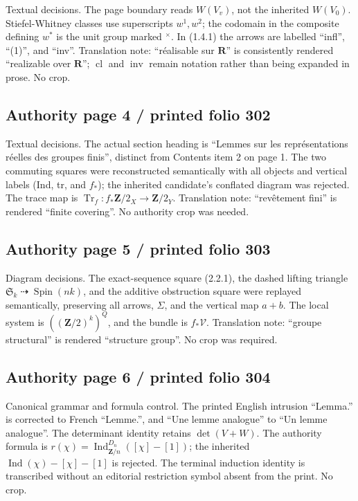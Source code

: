 \documentclass[10pt]{article}
\providecommand{\dashrightarrow}{\mathrel{⇢}}
\begin{document}
Textual decisions. The page boundary reads \(W(V_v)\), not the inherited \(W(V_0)\). Stiefel-Whitney classes use superscripts \(w^1,w^2\); the codomain in the composite defining \(w^*\) is the unit group marked \({}^\times\). In (1.4.1) the arrows are labelled “infl”, “(1)”, and “inv”. Translation note: “réalisable sur \(\mathbf R\)” is consistently rendered “realizable over \(\mathbf R\)”; \(\operatorname{cl}\) and \(\operatorname{inv}\) remain notation rather than being expanded in prose. No crop.\par

\subsection*{Authority page 4 / printed folio 302}

Textual decisions. The actual section heading is “Lemmes sur les représentations réelles des groupes finis”, distinct from Contents item 2 on page 1. The two commuting squares were reconstructed semantically with all objects and vertical labels (Ind, tr, and \(f_*\)); the inherited candidate’s conflated diagram was rejected. The trace map is \(\operatorname{Tr}_f:f_*\mathbf Z/2_X\to\mathbf Z/2_Y\). Translation note: “revêtement fini” is rendered “finite covering”. No authority crop was needed.\par

\subsection*{Authority page 5 / printed folio 303}

Diagram decisions. The exact-sequence square (2.2.1), the dashed lifting triangle \(\mathfrak S_k\dashrightarrow\operatorname{Spin}(nk)\), and the additive obstruction square were replayed semantically, preserving all arrows, \(\Sigma\), and the vertical map \(a+b\). The local system is \(((\mathbf Z/2)^k)^Q\), and the bundle is \(f_*\mathcal V\). Translation note: “groupe structural” is rendered “structure group”. No crop was required.\par

\subsection*{Authority page 6 / printed folio 304}

Canonical grammar and formula control. The printed English intrusion “Lemma.” is corrected to French “Lemme.”, and “Une lemme analogue” to “Un lemme analogue”. The determinant identity retains \(\det(V+W)\). The authority formula is \(r(\chi)=\operatorname{Ind}_{\mathbf Z/n}^{D_n}([\chi]-[1])\); the inherited \(\operatorname{Ind}(\chi)-[\chi]-[1]\) is rejected. The terminal induction identity is transcribed without an editorial restriction symbol absent from the print. No crop.\par
\end{document}
